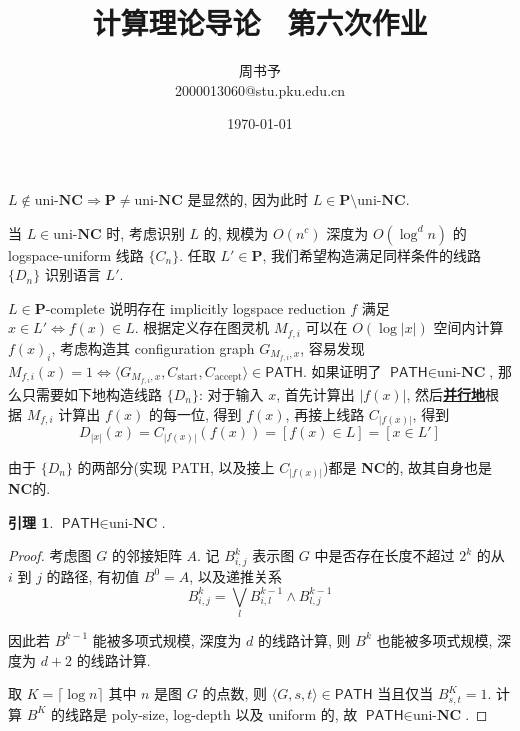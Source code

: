 \documentclass[8pt]{article}
\title{\heiti\zihao{1} 计算理论导论 \ 第六次作业}
\author{\kaishu\zihao{-3} 周书予\\2000013060@stu.pku.edu.cn}
\date{\today}
\theoremstyle{compact}
\newtheorem{lemma}{引理}
\def\obj#1{\textbf{\uline{#1}}}
\begin{document}
\pagestyle{plain}



\maketitle
\def\L{\textbf{L}}
\def\P{\textbf{P}}
\def\NC{\text{uni-}\textbf{NC}}
\section{}

$L \notin \NC \Rightarrow \P \neq \NC$ 是显然的, 因为此时 $L \in \P \setminus \NC$.

当 $L \in \NC$ 时, 考虑识别 $L$ 的, 规模为 $O(n^c)$ 深度为 $O(\log^d n)$ 的 logspace-uniform 线路 $\{C_n\}$. 任取 $L' \in \P$, 我们希望构造满足同样条件的线路 $\{D_n\}$ 识别语言 $L'$.

$L \in \P$-complete 说明存在 implicitly logspace reduction $f$ 满足 $x \in L' \Leftrightarrow f(x) \in L$. 根据定义存在图灵机 $M_{f, i}$ 可以在 $O(\log |x|)$ 空间内计算 $f(x)_i$, 考虑构造其 configuration graph $G_{M_{f, i}, x}$, 容易发现 $M_{f, i}(x) = 1 \Leftrightarrow \langle G_{M_{f, i}, x}, C_{\text{start}}, C_{\text{accept}} \rangle \in \textsf{PATH}$. 如果证明了 $\textsf{PATH} \in \NC$, 那么只需要如下地构造线路 $\{D_n\}$: 对于输入 $x$, 首先计算出 $|f(x)|$, 然后\obj{并行地}根据 $M_{f, i}$ 计算出 $f(x)$ 的每一位, 得到 $f(x)$, 再接上线路 $C_{|f(x)|}$, 得到 $$D_{|x|}(x) = C_{|f(x)|}(f(x)) = [f(x) \in L] = [x \in L']$$

由于 $\{D_n\}$ 的两部分(实现 \textsf{PATH}, 以及接上 $C_{|f(x)|}$)都是 \NC 的, 故其自身也是 \NC 的.

\begin{lemma}
	$\textsf{PATH} \in \NC$.
\end{lemma}
\begin{proof}
	考虑图 $G$ 的邻接矩阵 $A$. 记 $B^k_{i, j}$ 表示图 $G$ 中是否存在长度不超过 $2^k$ 的从 $i$ 到 $j$ 的路径, 有初值 $B^0 = A$, 以及递推关系 $$B^k_{i, j} = \bigvee_{l}B^{k-1}_{i,l} \wedge B^{k-1}_{l,j}$$

	因此若 $B^{k-1}$ 能被多项式规模, 深度为 $d$ 的线路计算, 则 $B^k$ 也能被多项式规模, 深度为 $d+2$ 的线路计算.

	取 $K = \lceil \log n \rceil$ 其中 $n$ 是图 $G$ 的点数, 则 $\langle G, s, t \rangle \in \textsf{PATH}$ 当且仅当 $B^K_{s, t} = 1$. 计算 $B^K$ 的线路是 poly-size, log-depth 以及 uniform 的, 故 $\textsf{PATH} \in \NC$.
\end{proof}
\end{document}
